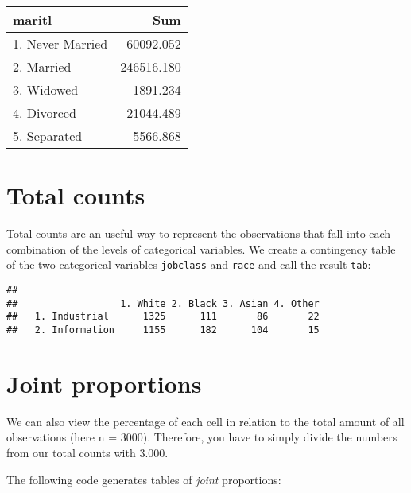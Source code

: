 \documentclass[
]{book}
\newenvironment{Shaded}{\begin{snugshade}}{\end{snugshade}}
\newcommand{\FunctionTok}[1]{\textcolor[rgb]{0.00,0.00,0.00}{#1}}
\newcommand{\NormalTok}[1]{#1}
\newcommand{\OtherTok}[1]{\textcolor[rgb]{0.56,0.35,0.01}{#1}}
\newcommand{\SpecialCharTok}[1]{\textcolor[rgb]{0.00,0.00,0.00}{#1}}
\begin{document}
\captionsetup[table]{labelformat=empty,skip=1pt}
\begin{longtable}{lr}
\toprule
maritl & Sum \\ 
\midrule
1. Never Married & 60092.052 \\ 
2. Married & 246516.180 \\ 
3. Widowed & 1891.234 \\ 
4. Divorced & 21044.489 \\ 
5. Separated & 5566.868 \\ 
\bottomrule
\end{longtable}

\hypertarget{total-counts}{%
\section{Total counts}\label{total-counts}}

Total counts are an useful way to represent the observations that fall into each combination of the levels of categorical variables. We create a contingency table of the two categorical variables \texttt{jobclass} and \texttt{race} and call the result \texttt{tab}:

\begin{Shaded}
\end{Shaded}

\begin{verbatim}
##                 
##                  1. White 2. Black 3. Asian 4. Other
##   1. Industrial      1325      111       86       22
##   2. Information     1155      182      104       15
\end{verbatim}

\hypertarget{joint-proportions}{%
\section{Joint proportions}\label{joint-proportions}}

We can also view the percentage of each cell in relation to the total amount of all observations (here n = 3000). Therefore, you have to simply divide the numbers from our total counts with 3.000.

The following code generates tables of \emph{joint} proportions:
\end{document}
